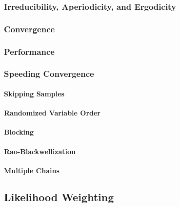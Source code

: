 			\subsubsection{Irreducibility, Aperiodicity, and Ergodicity} %

			\subsubsection{Convergence} %

			\subsubsection{Performance} %

			\subsubsection{Speeding Convergence} %

				\paragraph{Skipping Samples} %

				\paragraph{Randomized Variable Order} %

				\paragraph{Blocking} %

				\paragraph{Rao-Blackwellization} %

				\paragraph{Multiple Chains} %

		\subsection{Likelihood Weighting} %


